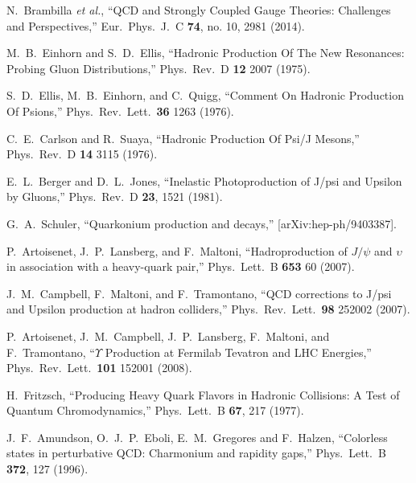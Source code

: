 \documentclass[aps,prc,preprint,superscriptaddress,showpacs,showkeys,amsmath]{revtex4-1}
\begin{document}
\begin{thebibliography}{100}
  N.~Brambilla {\it et al.},
  ``QCD and Strongly Coupled Gauge Theories: Challenges and Perspectives,''
  Eur.\ Phys.\ J.\ C {\bf 74}, no. 10, 2981 (2014).



  M.~B.~Einhorn and S.~D.~Ellis,
  ``Hadronic Production Of The New Resonances: Probing Gluon Distributions,''
  Phys.\ Rev.\  D {\bf 12} 2007 (1975).

  S.~D.~Ellis, M.~B.~Einhorn, and C.~Quigg,
  ``Comment On Hadronic Production Of Psions,''
  Phys.\ Rev.\ Lett.\  {\bf 36} 1263 (1976).

  C.~E.~Carlson and R.~Suaya,
  ``Hadronic Production Of Psi/J Mesons,''
  Phys.\ Rev.\  D {\bf 14} 3115 (1976).
  
  E.~L.~Berger and D.~L.~Jones,
  ``Inelastic Photoproduction of J/psi and Upsilon by Gluons,''
  Phys.\ Rev.\ D {\bf 23}, 1521 (1981).

  G.~A.~Schuler,        
  ``Quarkonium production and decays,''
  [arXiv:hep-ph/9403387].


  P.~Artoisenet, J.~P.~Lansberg, and F.~Maltoni,
  ``Hadroproduction of $J/\psi$ and $\upsilon$ in association with a
  heavy-quark pair,''
  Phys.\ Lett.\  B {\bf 653} 60 (2007).


  J.~M.~Campbell, F.~Maltoni, and F.~Tramontano,
  ``QCD corrections to J/psi and Upsilon production at hadron colliders,''
  Phys.\ Rev.\ Lett.\  {\bf 98} 252002 (2007).


  P.~Artoisenet, J.~M.~Campbell, J.~P.~Lansberg, F.~Maltoni, and F.~Tramontano,
  ``$\Upsilon$ Production at Fermilab Tevatron and LHC Energies,''
  Phys.\ Rev.\ Lett.\  {\bf 101} 152001 (2008).
  

  H.~Fritzsch,
  ``Producing Heavy Quark Flavors in Hadronic Collisions: A Test of Quantum Chromodynamics,''
  Phys.\ Lett.\ B {\bf 67}, 217 (1977).
  
  J.~F.~Amundson, O.~J.~P.~Eboli, E.~M.~Gregores and F.~Halzen,
  ``Colorless states in perturbative QCD: Charmonium and rapidity gaps,''
  Phys.\ Lett.\ B {\bf 372}, 127 (1996).



\end{thebibliography}
\end{document}
